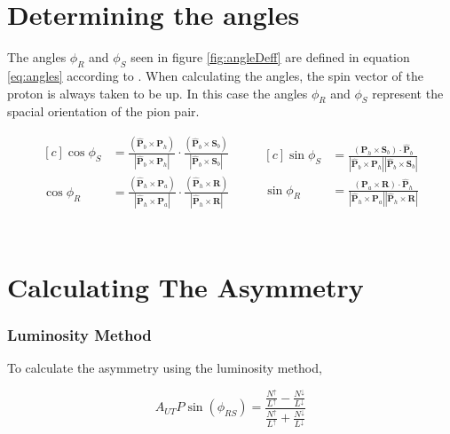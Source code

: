 \documentclass[abstract = on,listof=totoc, bibliography=totoc]{scrreprt}
\newcommand{\phir}{\phi_{R}}
\newcommand{\phis}{\phi_{S}}
\begin{document}
\section{Determining the angles}

The angles $\phir$ and $\phis$ seen in figure \ref{fig:angleDeff} are defined in equation \ref{eq:angles} according to \cite{bacchettaRedici2}. When calculating the angles, the spin vector of the proton is always taken to be up. In this case the angles $\phir$ and $\phis$ represent the spacial orientation of the pion pair.  

\begin{equation}
\label{eq:angles}
\begin{aligned}[c]
\cos\phi_S &= \frac{(\bm{\hat{P}}_b \times \bm{P}_h)}{|\bm{\hat{P}}_b \times \bm{P}_h|} \cdot \frac{(\bm{\hat{P}}_b \times \bm{S}_b)}{|\bm{\hat{P}}_b \times \bm{S}_b|} \\
\cos\phi_R &= \frac{(\bm{\hat{P}}_h \times \bm{P}_a)}{|\bm{\hat{P}}_h \times \bm{P}_a|} \cdot \frac{(\bm{\hat{P}}_h \times \bm{R})}{|\bm{\hat{P}}_h \times \bm{R}|} \\
\end{aligned}
\qquad
\begin{aligned}[c]
\sin\phi_S &= \frac{(\bm{P}_h \times \bm{S}_b) \cdot \bm{\hat{P}}_b}{|\bm{\hat{P}}_b \times \bm{P}_h| |\bm{\hat{P}}_b \times \bm{S}_b|} \\
\sin\phi_R &= \frac{(\bm{P}_a \times \bm{R}) \cdot \bm{\hat{P}}_h}{|\bm{\hat{P}}_h \times \bm{P}_a| |\bm{\hat{P}}_h \times \bm{R}|} 
\end{aligned}
\end{equation}\\




\FloatBarrier
\section{Calculating The Asymmetry}




\subsubsection{Luminosity Method}

To calculate the asymmetry using the luminosity method, 

\begin{equation}
A_{UT}P\sin\left(\phi_{RS}\right) = \frac{\frac{N^\uparrow}{L^\uparrow} - \frac{N^\downarrow}{L^\downarrow}} {\frac{N^\uparrow}{L^\uparrow} + \frac{N^\downarrow}{L^\downarrow}}
\end{equation}
\end{document}
